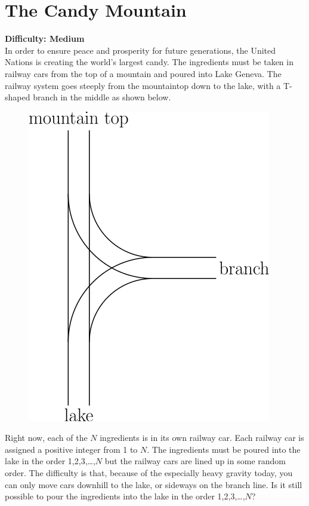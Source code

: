 \documentclass{contest-set}
\begin{document}
\section{The Candy Mountain}
\textbf{Difficulty: Medium}\\[0.5\baselineskip]
In order to ensure peace and prosperity for future generations, the United Nations is creating the world's largest candy. The ingredients must be taken in railway cars from the top of a mountain and poured into Lake Geneva. The railway system goes steeply from the mountaintop down to the lake, with a T-shaped branch in the middle as shown below.
\begin{figure}
    \centering
    \includegraphics[scale=0.3]{the-candy-mountain-1}
\end{figure}
Right now, each of the $N$ ingredients is in its own railway car. Each railway car is assigned a positive integer from 1 to $N$. The ingredients must be poured into the lake in the order 1,2,3,…,$N$ but the railway cars are lined up in some random order. The difficulty is that, because of the especially heavy gravity today, you can only move cars downhill to the lake, or sideways on the branch line. Is it still possible to pour the ingredients into the lake in the order 1,2,3,…,$N$?
\end{document}
